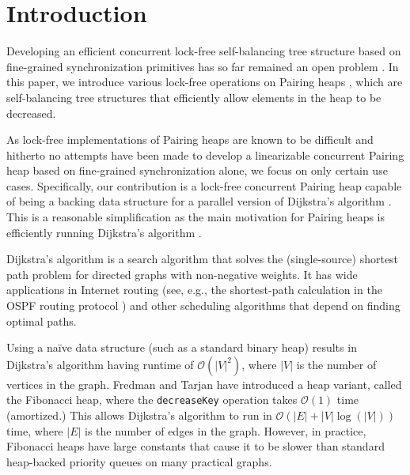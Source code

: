 \documentclass{acm_proc_article-sp}
\begin{document}
\section{Introduction}
Developing an efficient concurrent
lock-free self-balancing tree structure based on fine-grained
synchronization primitives has so far remained an open problem \cite{bronson10} \cite{fraser03}.
In this paper, we introduce various lock-free operations on
Pairing heaps \cite{fredman86}, which are self-balancing tree structures that
efficiently allow elements in the heap to be decreased.

As lock-free implementations of Pairing heaps are known to be difficult \cite{hendler10} and
hitherto no attempts have been made to develop a linearizable concurrent Pairing heap based on fine-grained
synchronization alone,
we focus on only certain use cases. Specifically, our contribution is a
lock-free concurrent Pairing heap capable of being
a backing data structure for a parallel version of Dijkstra's algorithm \cite{dijkstra59}.
This is a reasonable simplification as the main motivation for Pairing heaps is efficiently running
Dijkstra's algorithm \cite{fredman86}.

Dijkstra's algorithm \cite{dijkstra59} is a search
algorithm that solves the (single-source) shortest
path problem for directed graphs with non-negative
weights. It has wide applications in Internet routing
(see, e.g., the shortest-path calculation in the OSPF
routing protocol \cite{rfc5340}) and other scheduling
algorithms that depend on finding optimal paths.

Using a na\"{i}ve data structure (such as a standard binary heap)
results in Dijkstra's algorithm having runtime of $\mathcal{O}(|V|^2)$, where $|V|$
is the number of vertices in the graph. Fredman and Tarjan have
introduced \cite{fredman87} a heap variant, called the Fibonacci heap,
where the \texttt{decreaseKey} operation takes $\mathcal{O}(1)$ time
(amortized.) This allows Dijkstra's algorithm to run in $\mathcal{O}(|E| + |V|\log(|V|))$
time, where $|E|$ is the number of edges in the graph.
However, in practice, Fibonacci heaps have large constants that
cause it to be slower than standard heap-backed priority queues
on many practical graphs.
\end{document}
